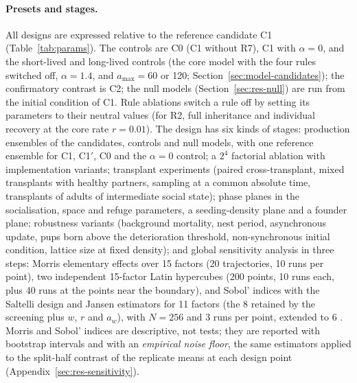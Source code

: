 \paragraph{Presets and stages.}
All designs are expressed relative to the reference candidate \textsf{C1} (Table~\ref{tab:params}). The controls
are \textsf{C0} (\textsf{C1} without R7), \textsf{C1} with $\alpha=0$, and the short-lived and long-lived controls
(the core model with the four rules switched off, $\alpha=1.4$, and $a_{\max}=60$ or 120;
Section~\ref{sec:model-candidates}); the confirmatory contrast is \textsf{C2}; the null models
(Section~\ref{sec:res-null}) are run from the initial condition of \textsf{C1}. Rule ablations switch a rule off by
setting its parameters to their neutral values (for R2, full inheritance and individual recovery at the core
rate $r=0.01$). The design has six kinds of stages: production ensembles of the candidates, controls and null models, with
one reference ensemble for \textsf{C1}, \textsf{C1}$'$, \textsf{C0} and the $\alpha=0$ control; a $2^4$ factorial
ablation with implementation variants; transplant experiments (paired cross-transplant, mixed transplants with
healthy partners, sampling at a common absolute time, transplants of adults of intermediate social state); phase
planes in the socialisation, space and refuge parameters, a seeding-density plane and a founder plane; robustness
variants (background mortality, nest period, asynchronous update, pups born above the deterioration threshold,
non-synchronous initial condition, lattice size at fixed density); and global sensitivity analysis in three steps:
Morris elementary effects over 15 factors (20 trajectories, 10 runs per point), two independent 15-factor Latin
hypercubes (200 points, 10 runs each, plus 40 runs at the points near the boundary), and Sobol' indices with the
Saltelli design and Jansen estimators \cite{Saltelli2010} for 11 factors (the 8 retained by the screening plus $w$,
$r$ and $a_w$), with $N=256$ and 3 runs per point, extended to 6 \cite{tenBroeke2016}.
Morris and Sobol' indices are descriptive, not tests; they are reported with bootstrap intervals and with an
\emph{empirical noise floor}, the same estimators applied to the split-half contrast of the replicate means at each
design point (Appendix~\ref{sec:res-sensitivity}).


